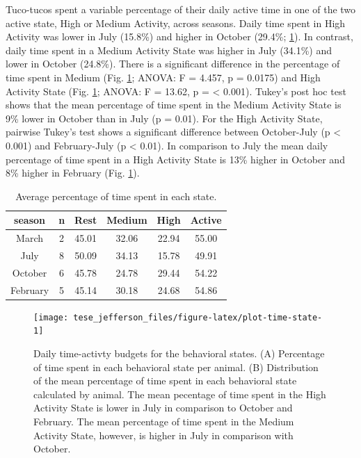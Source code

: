 \documentclass[english,msc,numbers,hidelinks]{coppe}
\begin{document}
  Tuco-tucos spent a variable percentage of their daily active time in one of the two active state, High or Medium Activity, across seasons. Daily time spent in High Activity was lower in July (15.8\%) and higher in October (29.4\%; \ref{tab:table-time-state}). In contrast, daily time spent in a Medium Activity State was higher in July (34.1\%) and lower in October (24.8\%). There is a significant difference in the percentage of time spent in Medium (Fig. \ref{fig:plot-time-state}; ANOVA: F = 4.457, p = 0.0175) and High Activity State (Fig. \ref{fig:plot-time-state}; ANOVA: F = 13.62, p = \textless{} 0.001). Tukey's post hoc test shows that the mean percentage of time spent in the Medium Activity State is 9\% lower in October than in July (p = 0.01). For the High Activity State, pairwise Tukey's test shows a significant difference between October-July (p \textless{} 0.001) and February-July (p \textless{} 0.01). In comparison to July the mean daily percentage of time spent in a High Activity State is 13\% higher in October and 8\% higher in February (Fig. \ref{fig:plot-time-state}).
  \begin{table}[!h]

  \caption{\label{tab:table-time-state}Average percentage of time spent in each state.}
  \centering
  \begin{tabular}[t]{cccccc}
  \toprule
  season & n & Rest & Medium & High & Active\\
  \midrule
  March & 2 & 45.01 & 32.06 & 22.94 & 55.00\\
  July & 8 & 50.09 & 34.13 & 15.78 & 49.91\\
  October & 6 & 45.78 & 24.78 & 29.44 & 54.22\\
  February & 5 & 45.14 & 30.18 & 24.68 & 54.86\\
  \bottomrule
  \end{tabular}
  \end{table}
  \begin{figure}

  {\centering \texttt{[image: tese\_jefferson\_files/figure-latex/plot-time-state-1]} 

  }

  \caption{Daily time-activty budgets for the behavioral states. (A) Percentage of time spent in each behavioral state per animal. (B) Distribution of the mean percentage of time spent in each behavioral state calculated by animal. The mean pecentage of time spent in the High Activity State is lower in July in comparison to October and February. The mean percentage of time spent in the Medium Activity State, however, is higher in July in comparison with October.}\label{fig:plot-time-state}
  \end{figure}
  \newpage
\end{document}
